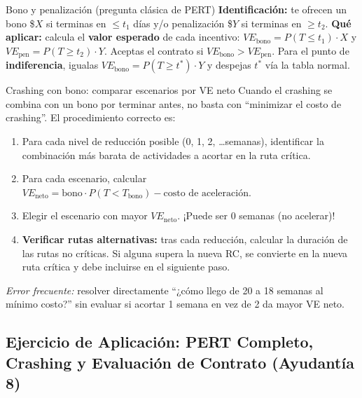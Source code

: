 \begin{tipprueba}{Bono y penalización (pregunta clásica de PERT)}
\textbf{Identificación:} te ofrecen un bono \$$X$ si terminas en $\le t_1$ días y/o penalización \$$Y$ si terminas en $\ge t_2$. \textbf{Qué aplicar:} calcula el \textbf{valor esperado} de cada incentivo: $VE_{\text{bono}} = P(T\le t_1)\cdot X$ y $VE_{\text{pen}} = P(T\ge t_2)\cdot Y$. Aceptas el contrato si $VE_{\text{bono}} > VE_{\text{pen}}$. Para el punto de \textbf{indiferencia}, igualas $VE_{\text{bono}} = P(T\ge t^*) \cdot Y$ y despejas $t^*$ vía la tabla normal.
\end{tipprueba}

\begin{tipprueba}{Crashing con bono: comparar escenarios por VE neto}
Cuando el crashing se combina con un bono por terminar antes, no basta con ``minimizar el costo de crashing''. El procedimiento correcto es:
\begin{enumerate}[leftmargin=1.5em, itemsep=2pt]
  \item Para cada nivel de reducción posible (0, 1, 2, \ldots semanas), identificar la combinación más barata de actividades a acortar en la ruta crítica.
  \item Para cada escenario, calcular $VE_{\text{neto}} = \text{bono} \cdot P(T < T_{\text{bono}}) - \text{costo de aceleración}$.
  \item Elegir el escenario con mayor $VE_{\text{neto}}$. ¡Puede ser 0 semanas (no acelerar)!
  \item \textbf{Verificar rutas alternativas:} tras cada reducción, calcular la duración de las rutas no críticas. Si alguna supera la nueva RC, se convierte en la nueva ruta crítica y debe incluirse en el siguiente paso.
\end{enumerate}
\textit{Error frecuente:} resolver directamente ``¿cómo llego de 20 a 18 semanas al mínimo costo?'' sin evaluar si acortar 1 semana en vez de 2 da mayor VE neto.
\end{tipprueba}


\clearpage
\subsection[Proyectos: PERT y Crashing (Ay. 8)]{Ejercicio de Aplicación: PERT Completo, Crashing y Evaluación de Contrato (Ayudantía 8)}

